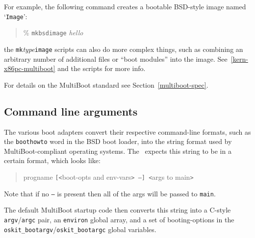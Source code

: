 For example, the following command
creates a bootable BSD-style image named `\texttt{Image}':
\begin{quote}
        \% \texttt{mkbsdimage} \textsl{hello}
\end{quote}
the \texttt{mk}\textsl{type}\texttt{image} scripts
can also do more complex things, such as combining an arbitrary
number of additional files or ``boot modules'' into the image.
See~\ref{kern-x86pc-multiboot} and the scripts for more info.

For details on the MultiBoot standard
see Section~\ref{multiboot-spec}.

\subsection{Command line arguments}

The various boot adapters convert their respective command-line
formats,
such as the \texttt{boothowto} word in the BSD boot loader,
into the string format used by MultiBoot-compliant operating systems.
The \oskit\ expects this string to be in a certain format,
which looks like:
\begin{quote}
	progname \texttt{[<}boot-opts and env-vars\texttt{> --}\texttt{] <}args to main\texttt{>}
\end{quote}
Note that if no \texttt{--} is present then all of the args
will be passed to \texttt{main}.

The default \oskit{} MultiBoot startup code then converts this string
into a C-style \texttt{argv}/\texttt{argc} pair,
an \texttt{environ} global array,
and a set of booting-options in the
\texttt{oskit_bootargv}/\texttt{oskit_bootargc} global variables.

